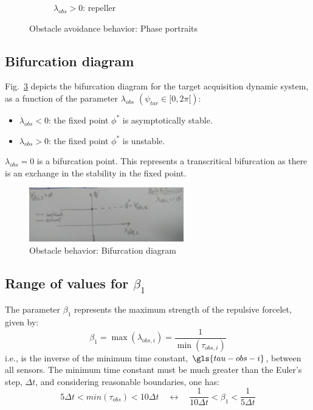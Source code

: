 \begin{figure}[!hbt]
\begin{subfigure}{.5\textwidth}
  \caption{$\lambda_{obs} > 0$: repeller}%
  \label{fig:obs-phase-port-2}
\end{subfigure}
\caption{Obstacle avoidance behavior: Phase portraits}%
\label{fig:obs-phase-portraits}
\end{figure}
%
\subsection{Bifurcation diagram}%
\label{sec:bifurcation-diagram-obs}
Fig.~\ref{fig:1-4-obs-bifurcation-diag} depicts the bifurcation diagram for the
target acquisition dynamic system, as a function of the parameter
$\lambda_{obs}$ $( \psi_{tar} \in [0, 2 \pi[ )$:
\begin{itemize}
\item $\lambda_{obs} < 0$: the fixed point $\phi^*$ is asymptotically stable.
\item $\lambda_{obs} > 0$: the fixed point $\phi^*$ is unstable.
\end{itemize}
%
$\lambda_{obs} = 0$ is a bifurcation point. This represents a transcritical bifurcation as there is an exchange in the
stability in the fixed point.
%
\begin{figure}[!hbt]
\centering
    \includegraphics[width=0.6\textwidth]{./img/obs-bifurcation-diag.jpg}
  \caption{Obstacle behavior: Bifurcation diagram}%
\label{fig:1-4-obs-bifurcation-diag}
\end{figure}
%
%
\subsection{Range of values for $\beta_1$}%
\label{sec:range-values-beta1}
The parameter $\beta_1$ represents the maximum strength of the repulsive
forcelet, given by:
\begin{equation}
  \label{eq:32}
  \beta_1 = \max( \lambda_{obs,i} ) = \frac{1}{\min( \tau_{obs,i} )}
\end{equation}
i.e., is the inverse of the minimum time constant, $\gls{tau-obs-i}$, between all sensors.
The minimum time constant must be much greater than the Euler's step, $\Delta
t$, and considering reasonable boundaries, one has: 
\begin{equation}
  \label{eq:33}
 5 \Delta t < min(\tau_{obs}) <  10 \Delta t 
\quad \leftrightarrow \quad  
 \frac{1}{10  \Delta t} < \beta_1 <  \frac{1}{5 \Delta t}
\end{equation}
%
